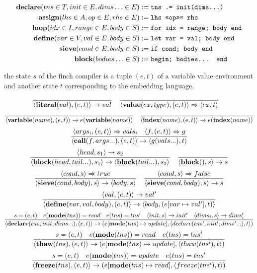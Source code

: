 \begin{align*}
    \text{\textbf{declare}}(tns \in T, init \in E, dims\ldots \in E) &:= \text{\texttt{tns .= init(dims...)}} \\
    \text{\textbf{assign}}(lhs \in A, op \in E, rhs \in E) &:= \text{\texttt{lhs \texttt{<<op>>=} rhs}} \\
    \text{\textbf{loop}}(idx \in I, range \in E, body \in S) &:= \text{\texttt{for idx = range; body end}} \\
    \text{\textbf{define}}(var \in V, val \in E, body \in S) &:= \text{\texttt{let var = val; body end}} \\
    \text{\textbf{sieve}}(cond \in E, body \in S) &:= \text{\texttt{if cond; body end}} \\
    \text{\textbf{block}}(bodies\ldots \in S) &:= \text{\texttt{begin; bodies... end}}
\end{align*}

the state $s$ of the finch compiler is a tuple $(e, t)$ of a variable value
environment and another state $t$ corresponding to the embedding language.

\[
    \frac{}{\langle\text{\textbf{literal}}(val), (e, t)\rangle \rightarrow val} \quad
    \frac{}{\langle\text{\textbf{value}}(ex, type), (e, t)\rangle \Rightarrow \langle ex, t \rangle} \quad
\]
\[
    \frac{}{\langle\text{\textbf{variable}}(name), (e, t)\rangle \rightarrow e(\text{\textbf{variable}}(name))} \quad
    \frac{}{\langle\text{\textbf{index}}(name), (e, t)\rangle \rightarrow e(\text{\textbf{index}}(name))}
\]
\[
    \frac{\langle args_i, (e, t) \rangle \Rightarrow vals_i \quad \langle f, (e, t) \rangle \Rightarrow g}
    {\langle\text{\textbf{call}}(f, args...), (e, t)\rangle \rightarrow \langle g(vals...), t \rangle}
\]
\[
\frac{\langle head, s_1 \rangle \rightarrow s_2}
{\langle\text{\textbf{block}}(head, tail...), s_1 \rangle \rightarrow \langle \text{\textbf{block}}(tail...), s_2 \rangle} \quad
\frac{}{\langle\text{\textbf{block}}(), s\rangle \rightarrow s}
\]
\[
\frac{\langle cond, s \rangle \Rightarrow true}
{\langle\text{\textbf{sieve}}(cond, body), s\rangle \rightarrow \langle body, s \rangle}\quad
\frac{\langle cond, s \rangle \Rightarrow false}
{\langle\text{\textbf{sieve}}(cond, body), s\rangle \rightarrow s}
\]
\[
\frac{\langle val, (e, t) \rangle \rightarrow val'}
{\langle\text{\textbf{define}}(var, val, body), (e, t)\rangle \rightarrow \langle body, (e[var \mapsto val'], t) \rangle}
\]
\[
\frac{s = (e, t) \quad e(\text{\textbf{mode}}(tns)) = read \quad e(tns) = tns' \quad  \langle init, s \rangle \rightarrow init' \quad  \langle dims_i, s \rangle \rightarrow dims_i'}
{\langle\text{\textbf{declare}}(tns, init, dims...), (e, t)\rangle \rightarrow (e [\text{\textbf{mode}}(tns) \mapsto update], \langle declare(tns', init', dims'...), t \rangle)}
\]
\[
\frac{s = (e, t) \quad e(\text{\textbf{mode}}(tns)) = read \quad e(tns) = tns'}
{\langle\text{\textbf{thaw}}(tns), (e, t)\rangle \rightarrow (e [\text{\textbf{mode}}(tns) \mapsto update], \langle thaw(tns'), t \rangle)}
\]
\[
\frac{s = (e, t) \quad e(\text{\textbf{mode}}(tns)) = update \quad e(tns) = tns'}
{\langle\text{\textbf{freeze}}(tns), (e, t)\rangle \rightarrow (e [\text{\textbf{mode}}(tns) \mapsto read], \langle freeze(tns'), t \rangle)}
\]


